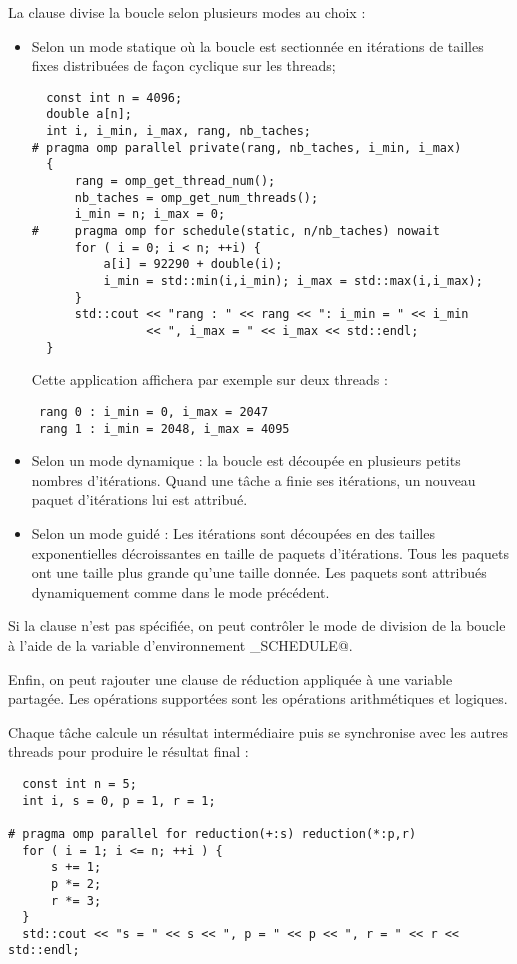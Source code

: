\documentclass[fleqn,11pt]{article}
\begin{document}
La clause \verb@schedule@ divise la boucle selon plusieurs modes au choix :

\begin{itemize}
 \item Selon un mode statique où la boucle est sectionnée en itérations de tailles fixes distribuées
 de façon cyclique sur les threads;
 \begin{lstlisting}
  const int n = 4096;
  double a[n];
  int i, i_min, i_max, rang, nb_taches;
# pragma omp parallel private(rang, nb_taches, i_min, i_max)
  {
      rang = omp_get_thread_num();
      nb_taches = omp_get_num_threads();
      i_min = n; i_max = 0;
#     pragma omp for schedule(static, n/nb_taches) nowait
      for ( i = 0; i < n; ++i) {
          a[i] = 92290 + double(i);
          i_min = std::min(i,i_min); i_max = std::max(i,i_max);
      }
      std::cout << "rang : " << rang << ": i_min = " << i_min
                << ", i_max = " << i_max << std::endl;
  }
 \end{lstlisting}
 Cette application affichera par exemple sur deux threads :
 \begin{verbatim}
 rang 0 : i_min = 0, i_max = 2047
 rang 1 : i_min = 2048, i_max = 4095 
 \end{verbatim}

 \item Selon un mode dynamique : la boucle est découpée en plusieurs petits nombres d'itérations. Quand une tâche
 a finie ses itérations, un nouveau paquet d'itérations lui est attribué.
 \item Selon un mode guidé : Les itérations sont découpées en des tailles exponentielles décroissantes
 en taille de paquets d'itérations. Tous les paquets ont une taille plus grande qu'une taille donnée. Les paquets
 sont attribués dynamiquement comme dans le mode précédent.
\end{itemize}

Si la clause  \verb@schedule@ n'est pas spécifiée, on peut contrôler le mode de division de la boucle à
l'aide de la variable d'environnement \verb@OMP_SCHEDULE@.

Enfin, on peut rajouter une clause de réduction appliquée à une variable partagée. Les opérations supportées
sont les opérations arithmétiques et logiques. 

Chaque tâche calcule un résultat intermédiaire puis se synchronise avec les autres threads pour produire le résultat
final :

\begin{lstlisting}
  const int n = 5;
  int i, s = 0, p = 1, r = 1;
  
# pragma omp parallel for reduction(+:s) reduction(*:p,r)
  for ( i = 1; i <= n; ++i ) {
      s += 1;
      p *= 2;
      r *= 3;
  }
  std::cout << "s = " << s << ", p = " << p << ", r = " << r << std::endl;
\end{lstlisting}
\end{document}
